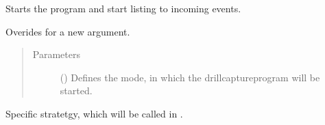 \documentclass[letterpaper,10pt,english]{sphinxmanual}
\begin{document}
\begin{fulllineitems}
\begin{quote}
\begin{description}
\begin{itemize}
\end{itemize}

\end{description}\end{quote}

\begin{fulllineitems}
\label{\detokenize{anoog.automation:anoog.automation.py_exe_interface.Drillcapture_Interface.run}}
\sphinxAtStartPar
Starts the program and start listing to incoming events.

\sphinxAtStartPar
Overides {\hyperref[\detokenize{anoog.automation:anoog.automation.py_exe_interface.Process_Interface.run}]{}} for a new argument.
\begin{quote}\begin{description}
\item[{Parameters}] \leavevmode
\sphinxAtStartPar
{} (\sphinxstyleliteralemphasis{\sphinxupquote{, }}) \textendash{} Defines the mode, in which the drillcapture\sphinxhyphen{}program will be started.

\end{description}\end{quote}

\end{fulllineitems}


\begin{fulllineitems}
\label{\detokenize{anoog.automation:anoog.automation.py_exe_interface.Drillcapture_Interface.start_program}}
\sphinxAtStartPar
Specific stratetgy, which will be called in {\hyperref[\detokenize{anoog.automation:anoog.automation.py_exe_interface.Drillcapture_Interface.run}]{}}.


\end{fulllineitems}
\end{fulllineitems}
\end{document}
